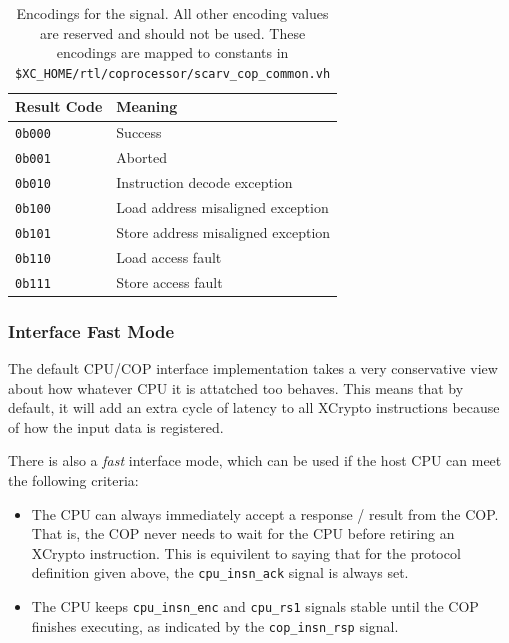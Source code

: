 \documentclass{article}
\begin{document}
\begin{table}[h!]
\centering
\begin{tabular}{ll}
\toprule
{\bf Result Code} & {\bf Meaning} \\
\midrule
 {\tt 0b000}  & Success \\
 {\tt 0b001}  & Aborted \\
 {\tt 0b010}  & Instruction decode exception \\
 {\tt 0b100}  & Load address misaligned exception  \\
 {\tt 0b101}  & Store address misaligned exception \\
 {\tt 0b110}  & Load access fault                  \\
 {\tt 0b111}  & Store access fault                 \\
 \bottomrule
\end{tabular}
\caption{Encodings for the  signal. All other encoding
values are reserved and should not be used. These encodings are
mapped to constants in {\tt \$XC\_HOME/rtl/coprocessor/scarv\_cop\_common.vh}}
\label{tab:cop-result-encodings}
\end{table}

\subsubsection{Interface Fast Mode}

The default CPU/COP interface implementation takes a very conservative
view about how whatever CPU it is attatched too behaves.
This means that by default, it will add an extra cycle of latency to all
XCrypto instructions because of how the input data is registered.

There is also a {\em fast} interface mode, which can be used if the host
CPU can meet the following criteria:

\begin{itemize}
\item The CPU can always immediately accept a response / result from the
    COP. That is, the COP never needs to wait for the CPU before
    retiring an XCrypto instruction.
    This is equivilent to saying that for the protocol definition
    given above, the {\tt cpu\_insn\_ack} signal is always set.
\item The CPU keeps {\tt cpu\_insn\_enc} and {\tt cpu\_rs1} signals
    stable until the COP finishes executing, as indicated by the
    {\tt cop\_insn\_rsp} signal.
\end{itemize}
\end{document}
